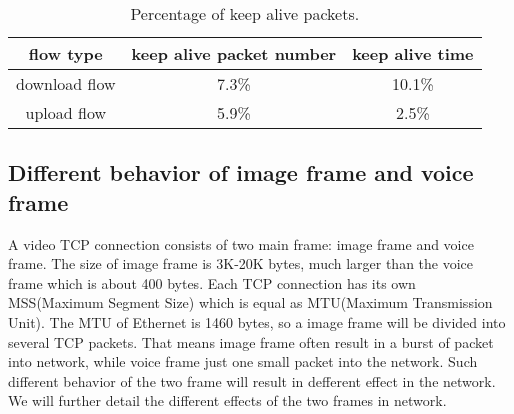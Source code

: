 \begin{table}[ht]
\tablefontsize
\renewcommand{\arraystretch}{\assize}
 \setlength{\tabcolsep}{3pt}
\caption{Percentage of keep alive packets.}
\centering
\begin{tabular}{c|c|c}
	\toprule
	 flow type & keep alive packet number & keep alive time \\
	\hline
	download flow & 7.3\% & 10.1\% \\
	\hline
	upload flow & 5.9\% & 2.5\% \\
	\bottomrule
\end{tabular}
\label{tbl:alive-packet}
\termspace
\end{table}  

\subsection{Different behavior of image frame and voice frame}
\label{sub:diff-gra-voice}

A video TCP connection consists of two main frame: image frame and voice frame. The size of image frame is 3K-20K bytes, much larger than the voice frame which is about 400 bytes. Each TCP connection has its own MSS(Maximum Segment Size) which is equal as MTU(Maximum Transmission Unit). The MTU of Ethernet is 1460 bytes, so a image frame will be divided into several TCP packets. That means image frame often result in a burst of packet into network, while voice frame just one small packet into the network. Such different behavior of the two frame will result in defferent effect in the network. We will further detail the different effects of the two frames in network.



